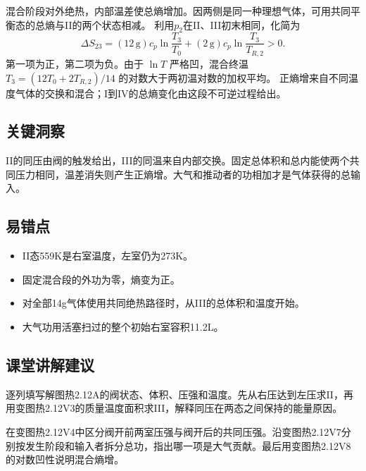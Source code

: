 \documentclass[UTF8,fontset=fandol,a4paper,11pt]{ctexart}
\begin{document}
混合阶段对外绝热，内部温差使总熵增加。因两侧是同一种理想气体，可用共同平衡态的总熵与II的两个状态相减。
利用$p_2$在II、III初末相同，化简为
\[
\Delta S_{23}
=(12\,\mathrm g)c_p\ln\frac{T_3}{T_0}
+(2\,\mathrm g)c_p\ln\frac{T_3}{T_{R,2}}>0.
\]
第一项为正，第二项为负。由于 $\ln T$ 严格凹，混合终温 $T_3=(12T_0+2T_{R,2})/14$ 的对数大于两初温对数的加权平均。
正熵增来自不同温度气体的交换和混合；I到IV的总熵变化由这段不可逆过程给出。




\subsection*{关键洞察}

II的同压由阀的触发给出，III的同温来自内部交换。固定总体积和总内能使两个共同压力相同，温差消失则产生正熵增。大气和推动者的功相加才是气体获得的总输入。



\subsection*{易错点}

\begin{itemize}
\item II态559K是右室温度，左室仍为273K。
\item 固定混合段的外功为零，熵变为正。
\item 对全部14g气体使用共同绝热路径时，从III的总体积和温度开始。
\item 大气功用活塞扫过的整个初始右室容积11.2L。
\end{itemize}



\subsection*{课堂讲解建议}

逐列填写解图热2.12A的阀状态、体积、压强和温度。先从右压达到左压求II，再用变图热2.12V3的质量温度面积求III，解释同压在两态之间保持的能量原因。

在变图热2.12V4中区分阀开前两室压强与阀开后的共同压强。沿变图热2.12V7分别按发生阶段和输入者拆分总功，指出哪一项是大气贡献。最后用变图热2.12V8的对数凹性说明混合熵增。
\end{document}
